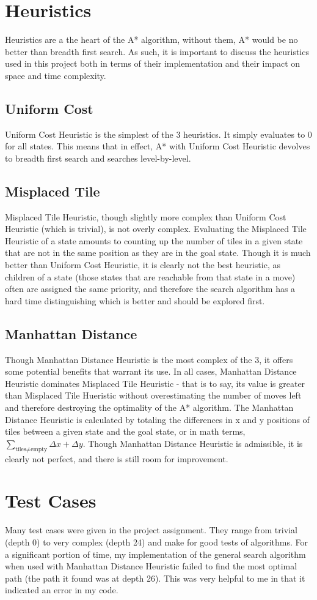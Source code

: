 \documentclass{article}
\begin{document}
\section{Heuristics}
Heuristics are a the heart of the A* algorithm, without them, A* would be no better than breadth first search. As such, it is important to discuss the heuristics used in this project both in terms of their implementation and their impact on space and time complexity.
\subsection{Uniform Cost}
Uniform Cost Heuristic is the simplest of the 3 heuristics. It simply evaluates to 0 for all states. This means that in effect, A* with Uniform Cost Heuristic devolves to breadth first search and searches level-by-level.
\subsection{Misplaced Tile}
Misplaced Tile Heuristic, though slightly more complex than Uniform Cost Heuristic (which is trivial), is not overly complex. Evaluating the Misplaced Tile Heuristic of a state amounts to counting up the number of tiles in a given state that are not in the same position as they are in the goal state. Though it is much better than Uniform Cost Heuristic, it is clearly not the best heuristic, as children of a state (those states that are reachable from that state in a move) often are assigned the same priority, and therefore the search algorithm has a hard time distinguishing which is better and should be explored first.
\subsection{Manhattan Distance}
Though Manhattan Distance Heuristic is the most complex of the 3, it offers some potential benefits that warrant its use. In all cases, Manhattan Distance Heuristic dominates Misplaced Tile Heuristic - that is to say, its value is greater than Misplaced Tile Hueristic without overestimating the number of moves left and therefore destroying the optimality of the A* algorithm. The Manhattan Distance Heuristic is calculated by totaling the differences in x and y positions of tiles between a given state and the goal state, or in math terms, $\sum_{\text{tiles}\neq\text{empty}}\Delta x + \Delta y$. Though Manhattan Distance Heuristic is admissible, it is clearly not perfect, and there is still room for improvement.
\section{Test Cases}
Many test cases were given in the project assignment. They range from trivial (depth 0) to very complex (depth 24) and make for good tests of algorithms. For a significant portion of time, my implementation of the general search algorithm when used with Manhattan Distance Heuristic failed to find the most optimal path (the path it found was at depth 26). This was very helpful to me in that it indicated an error in my code.
\end{document}
